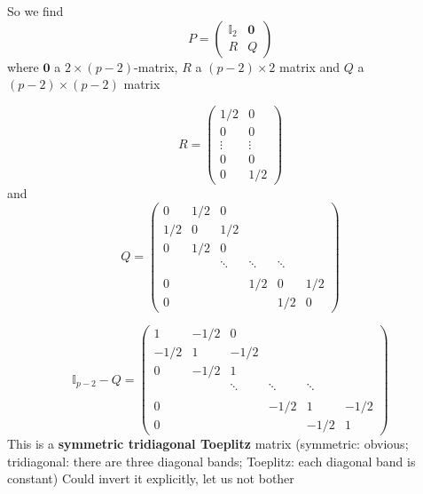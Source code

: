 \documentclass[aspectratio=43]{beamer}
\begin{document}
\begin{frame}
    So we find
    $$
    P=\begin{pmatrix}
    \mathbb{I}_2 & \mathbf{0} \\
    R & Q
    \end{pmatrix}
    $$
    where $\mathbf{0}$ a $2\times(p-2)$-matrix, $R$ a $(p-2)\times 2$ matrix and $Q$ a $(p-2)\times (p-2)$ matrix
\end{frame}


\begin{frame}
    $$
    R=
    \begin{pmatrix}
    1/2 & 0 \\
    0 & 0 \\
    \vdots & \vdots \\
    0 & 0 \\
    0 & 1/2   
    \end{pmatrix}
    $$
    and
    $$
    Q=
    \begin{pmatrix}
    0 & 1/2 & 0 & \\
    1/2 & 0 & 1/2 & \\
    0 & 1/2 & 0 & \\
    && \ddots & \ddots & \ddots \\
    &&&& \\
    0 &&& 1/2 & 0 & 1/2 \\
    0 &&&&1/2 & 0
    \end{pmatrix}
    $$
\end{frame}


\begin{frame}
    $$
    \mathbb{I}_{p-2}-Q=
    \begin{pmatrix}
    1 & -1/2 & 0 & \\
    -1/2 & 1 & -1/2 & \\
    0 & -1/2 & 1 & \\
    && \ddots & \ddots & \ddots \\
    &&&& \\
    0 &&& -1/2 & 1 & -1/2 \\
    0 &&&& -1/2 & 1
    \end{pmatrix}
    $$
    \vfill
    This is a \textbf{symmetric tridiagonal Toeplitz} matrix 
    \vfill
    (symmetric: obvious; tridiagonal: there are three diagonal bands; Toeplitz: each diagonal band is constant)
    \vfill
    Could invert it explicitly, let us not bother
\end{frame}

\end{document}
